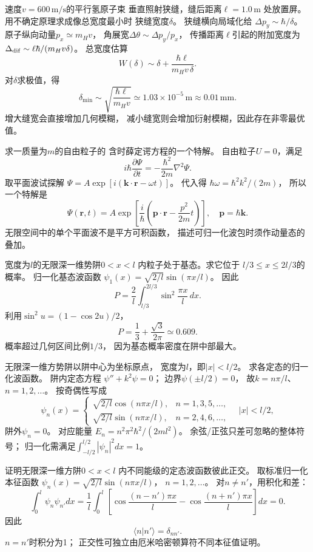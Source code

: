 速度$v=600\,\mathrm{m/s}$的平行氢原子束
垂直照射狭缝，缝后距离$\ell=1.0\,\mathrm m$
处放置屏。用不确定原理求成像总宽度最小时
狭缝宽度$\delta$。
\exsolution
狭缝横向局域化给
$\Delta p_y\sim\hbar/\delta$。
原子纵向动量$p_x\simeq m_Hv$，
角展宽$\Delta\theta\sim\Delta p_y/p_x$，
传播距离$\ell$引起的附加宽度为
$\Delta_{\rm dif}\sim\ell\hbar/(m_Hv\delta)$。
总宽度估算
\[
 W(\delta)\sim\delta+\frac{\hbar\ell}{m_Hv\,\delta}.
\]
对$\delta$求极值，得
\[
 \boxed{\delta_{\min}\sim\sqrt{\frac{\hbar\ell}{m_Hv}}
 \simeq1.03\times10^{-5}\,\mathrm m
 \approx0.01\,\mathrm{mm}}.
\]
\excheck 增大缝宽会直接增加几何模糊，
减小缝宽则会增加衍射模糊，因此存在非零最优值。

求一质量为$m$的自由粒子的
含时薛定谔方程的一个特解。
\exsolution
自由粒子$U=0$，满足
\[
 i\hbar\frac{\partial\Psi}{\partial t}
 =-\frac{\hbar^2}{2m}\nabla^2\Psi.
\]
取平面波试探解
$\Psi=A\exp[i(\boldsymbol k\cdot\boldsymbol r-\omega t)]$。
代入得
$\hbar\omega=\hbar^2k^2/(2m)$，
所以一个特解是
\[
 \boxed{\Psi(\boldsymbol r,t)=
 A\exp\!\left[\frac{i}{\hbar}
 \left(\boldsymbol p\cdot\boldsymbol r-\frac{p^2}{2m}t\right)\right]},
 \quad\boldsymbol p=\hbar\boldsymbol k.
\]
\excheck 无限空间中的单个平面波不是平方可积函数，
描述可归一化波包时须作动量态的叠加。

宽度为$l$的无限深一维势阱$0<x<l$
内粒子处于基态。求它位于
$l/3\le x\le2l/3$的概率。
\exsolution
归一化基态波函数
$\psi_1(x)=\sqrt{2/l}\sin(\pi x/l)$。
因此
\[
 P=\frac2l\int_{l/3}^{2l/3}\sin^2\frac{\pi x}{l}\,dx.
\]
利用$\sin^2u=(1-\cos2u)/2$，
\[
 \boxed{P=\frac13+\frac{\sqrt3}{2\pi}
 \simeq0.609}.
\]
\excheck 概率超过几何区间比例$1/3$，
因为基态概率密度在阱中部最大。

无限深一维方势阱以阱中心为坐标原点，
宽度为$l$，即$|x|<l/2$。
求各定态的归一化波函数。
\exsolution
阱内定态方程
$\psi''+k^2\psi=0$；
边界$\psi(\pm l/2)=0$，
故$k=n\pi/l$、$n=1,2,\dots$。
按奇偶性写成
\[
 \boxed{\psi_n(x)=
 \begin{cases}
 \sqrt{2/l}\cos(n\pi x/l),&n=1,3,5,\ldots,\\
 \sqrt{2/l}\sin(n\pi x/l),&n=2,4,6,\ldots,
 \end{cases}}
\quad |x|<l/2,
\]
阱外$\psi_n=0$。
对应能量
$E_n=n^2\pi^2\hbar^2/(2ml^2)$。
\excheck 余弦/正弦只差可忽略的整体符号；
归一化需满足$\int_{-l/2}^{l/2}|\psi_n|^2dx=1$。

证明无限深一维方阱$0<x<l$
内不同能级的定态波函数彼此正交。
\exsolution
取标准归一化本征函数
$\psi_n(x)=\sqrt{2/l}\sin(n\pi x/l)$，
$n=1,2,\dots$。
对$n\ne n'$，用积化和差：
\[
 \int_0^l\psi_n\psi_{n'}dx
 =\frac1l\int_0^l
 \left[\cos\frac{(n-n')\pi x}{l}
 -\cos\frac{(n+n')\pi x}{l}\right]dx=0.
\]
因此
\[
 \boxed{\langle n|n'\rangle=\delta_{nn'}}.
\]
\excheck $n=n'$时积分为1；
正交性可独立由厄米哈密顿算符不同本征值证明。

